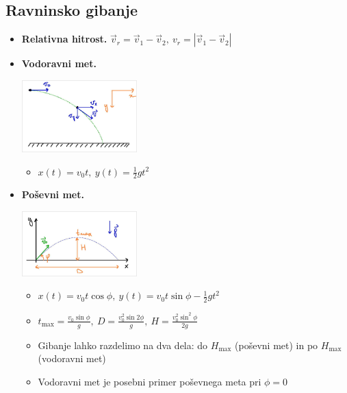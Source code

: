 \subsection{Ravninsko gibanje}
\begin{itemize}
    \item \textbf{Relativna hitrost.} \(\vec{v}_r = \vec{v}_1 - \vec{v}_2, \ v_r = |\vec{v}_1 - \vec{v}_2|\)
    
    \item \textbf{Vodoravni met.}
    \begin{center}
        \includegraphics[width=0.35\textwidth]{img/01_001.jpg}      
    \end{center}
    \begin{itemize}
        \item \(x(t) = v_0 t, \ y(t) = \frac{1}{2}gt^2\)
    \end{itemize}
    
    \item \textbf{Poševni met.}
    \begin{center}
        \includegraphics[width=0.35\textwidth]{img/01_002.jpg}      
    \end{center}
    \begin{itemize}
        \item \(x(t) = v_0 t \cos \phi, \ y(t) = v_0 t \sin \phi - \frac{1}{2}gt^2\)
        \item \(\boxed{t_\text{max} = \frac{v_0 \sin \phi}{g}, \ D = \frac{v_0^2 \sin 2 \phi}{g}, \ H = \frac{v_0^2\sin^2 \phi}{2g}}\)
        \item Gibanje lahko razdelimo na dva dela: do \(H_\text{max}\) (poševni met) in po \(H_\text{max}\) (vodoravni met)
        \item Vodoravni met je posebni primer poševnega meta pri \(\phi = 0\)
    \end{itemize}


\end{itemize}
